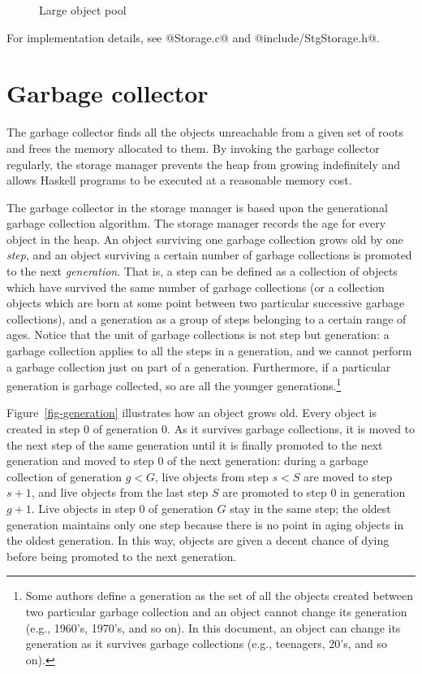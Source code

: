 \documentclass{article}
\begin{document}
\begin{figure}[ht]
\begin{center}

\caption{Large object pool}
\label{fig-largeobjectpool}
\end{center}
\end{figure}

For implementation details, see @Storage.c@ and @include/StgStorage.h@.

\section{Garbage collector}

The garbage collector finds all the objects unreachable from a given set of
roots and frees the memory allocated to them. By invoking the
garbage collector regularly, the storage manager prevents the heap from
growing indefinitely and allows Haskell programs to be executed at a 
reasonable memory cost.

The garbage collector in the storage manager is based upon the generational 
garbage collection algorithm.
The storage manager records the age for every object in the heap.
An object surviving one garbage collection grows old by one \emph{step},
and an object surviving a certain number of garbage collections 
is promoted to the next \emph{generation}.
That is, a step can be defined as a collection of objects which have survived
the same number of garbage collections (or a collection objects which are
born at some point between two particular successive garbage collections),
and a generation as a group of steps belonging to a certain range of ages.
Notice that the unit of garbage collections is not step but generation: 
a garbage collection applies to all the steps in a generation, and we cannot 
perform a garbage collection just on part of a generation.
Furthermore, if a particular generation is garbage collected, so are 
all the younger generations.\footnote{Some 
authors define a generation as the set of 
all the objects created between two particular garbage collection and
an object cannot change its generation (e.g., 1960's, 1970's, and so on).
In this document, 
an object can change its generation as it survives garbage collections
(e.g., teenagers, 20's, and so on).}

Figure~\ref{fig-generation} illustrates how an object grows old.
Every object is created in step $0$ of generation $0$. 
As it survives garbage collections, it is moved to the next step of the
same generation until it is finally promoted to the next generation and 
moved to step $0$ of the next generation:
during a garbage collection of generation $g < G$, live objects from 
step $s < S$ are moved to step $s + 1$, and live objects from
the last step $S$ are promoted to step $0$ in generation $g + 1$.
Live objects in step $0$ of generation $G$ stay in the same step;
the oldest generation maintains only one step because there is no point
in aging objects in the oldest generation.
In this way, objects are given a decent chance of dying before being
promoted to the next generation.
\end{document}
